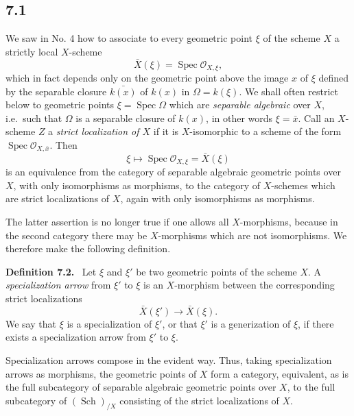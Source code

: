 \documentclass[11pt]{article}
\newcommand{\Oo}{\mathcal{O}}
\newcommand{\Sch}{\operatorname{Sch}}
\newcommand{\Spec}{\operatorname{Spec}}
\newcommand{\ie}{i.e.\ }
\newenvironment{statement}[1]{\par\medskip\noindent\textbf{#1.}\ }{\par\medskip}
\begin{document}
\subsection*{7.1}
We saw in No. 4 how to associate to every geometric point \(\xi\) of the scheme \(X\) a strictly local \(X\)-scheme
\[
\bar X(\xi)=\Spec\Oo_{X,\xi},
\]
which in fact depends only on the geometric point above the image \(x\) of \(\xi\) defined by the separable closure \(\bar{k(x)}\) of \(k(x)\) in \(\Omega=k(\xi)\). We shall often restrict below to geometric points \(\xi=\Spec\Omega\) which are \emph{separable algebraic} over \(X\), \ie such that \(\Omega\) is a separable closure of \(k(x)\), in other words \(\xi=\bar x\). Call an \(X\)-scheme \(Z\) a \emph{strict localization of \(X\)} if it is \(X\)-isomorphic to a scheme of the form \(\Spec\Oo_{X,\bar x}\). Then
\[
\xi\longmapsto \Spec\Oo_{X,\xi}=\bar X(\xi)
\]
is an equivalence from the category of separable algebraic geometric points over \(X\), with only isomorphisms as morphisms, to the category of \(X\)-schemes which are strict localizations of \(X\), again with only isomorphisms as morphisms.

The latter assertion is no longer true if one allows all \(X\)-morphisms, because in the second category there may be \(X\)-morphisms which are not isomorphisms. We therefore make the following definition.

\begin{statement}{Definition 7.2}
Let \(\xi\) and \(\xi'\) be two geometric points of the scheme \(X\). A \emph{specialization arrow} from \(\xi'\) to \(\xi\) is an \(X\)-morphism between the corresponding strict localizations
\[
\bar X(\xi')\longrightarrow \bar X(\xi).
\]
We say that \(\xi\) is a specialization of \(\xi'\), or that \(\xi'\) is a generization of \(\xi\), if there exists a specialization arrow from \(\xi'\) to \(\xi\).
\end{statement}

Specialization arrows compose in the evident way. Thus, taking specialization arrows as morphisms, the geometric points of \(X\) form a category, equivalent, as is the full subcategory of separable algebraic geometric points over \(X\), to the full subcategory of \((\Sch)_{/X}\) consisting of the strict localizations of \(X\).
\end{document}
